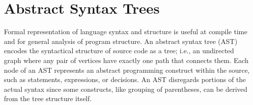
\section{Abstract Syntax Trees}
Formal representation of language syntax and structure is useful at compile time and for general analysis of program structure. An abstract syntax tree (AST) encodes the syntactical structure of source code as a tree; i.e., an undirected graph where any pair of vertices have exactly one path that connects them. Each node of an AST represents an abstract programming construct within the source, such as statements, expressions, or decisions. An AST disregards portions of the actual syntax since some constructs, like grouping of parentheses, can be derived from the tree structure itself.

